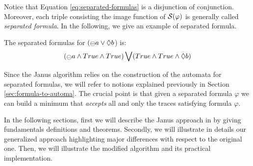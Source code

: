 Notice that Equation \ref{eq:separated-formulas} is a disjunction of conjunction. Moreover, each triple consisting the image function of $\S(\varphi)$ is generally called \emph{separated formula}. In the following, we give an example of separated formula.
\begin{example}\label{ex:separated-formulas}
The separated formulas for $(\Yesterday a \lOR \Diamond b$) is:
\begin{align*}
(\Yesterday a \lAND True \lAND True)\bigvee(True \lAND True \lAND \Diamond b)
\end{align*}
\end{example}

Since the Janus algorithm relies on the construction of the automata for separated \LTLp formulas, we will refer to notions explained previously in Section \ref{sec:formula-to-automa}. The crucial point is that given a separated \LTLp formula $\varphi$ we can build a minimum \DFA that \emph{accepts} all and only the traces satisfying formula $\varphi$.

In the following sections, first we will describe the Janus approach in \citep{cecconi2018interestingness} by giving fundamentals definitions and theorems. Secondly, we will illustrate in details our generalized approach highlighting major differences with respect to the original one. Then, we will illustrate the modified algorithm and its practical implementation.
